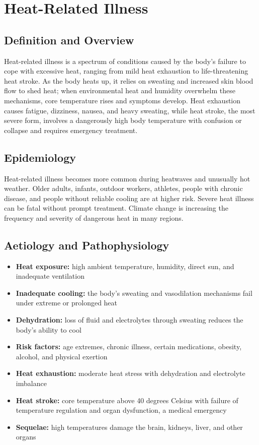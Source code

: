 \chapter{Heat-Related Illness}

\section*{Definition and Overview}
Heat-related illness is a spectrum of conditions caused by the body's failure to cope with excessive heat, ranging from mild heat exhaustion to life-threatening heat stroke. As the body heats up, it relies on sweating and increased skin blood flow to shed heat; when environmental heat and humidity overwhelm these mechanisms, core temperature rises and symptoms develop. Heat exhaustion causes fatigue, dizziness, nausea, and heavy sweating, while heat stroke, the most severe form, involves a dangerously high body temperature with confusion or collapse and requires emergency treatment.

\section*{Epidemiology}
Heat-related illness becomes more common during heatwaves and unusually hot weather. Older adults, infants, outdoor workers, athletes, people with chronic disease, and people without reliable cooling are at higher risk. Severe heat illness can be fatal without prompt treatment. Climate change is increasing the frequency and severity of dangerous heat in many regions.

\section*{Aetiology and Pathophysiology}
\begin{itemize}
    \item \textbf{Heat exposure:} high ambient temperature, humidity, direct sun, and inadequate ventilation
    \item \textbf{Inadequate cooling:} the body's sweating and vasodilation mechanisms fail under extreme or prolonged heat
    \item \textbf{Dehydration:} loss of fluid and electrolytes through sweating reduces the body's ability to cool
    \item \textbf{Risk factors:} age extremes, chronic illness, certain medications, obesity, alcohol, and physical exertion
    \item \textbf{Heat exhaustion:} moderate heat stress with dehydration and electrolyte imbalance
    \item \textbf{Heat stroke:} core temperature above 40 degrees Celsius with failure of temperature regulation and organ dysfunction, a medical emergency
    \item \textbf{Sequelae:} high temperatures damage the brain, kidneys, liver, and other organs
\end{itemize}

